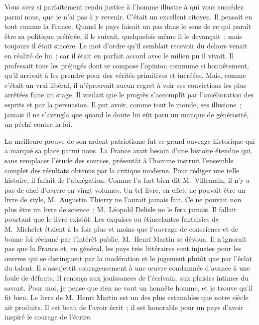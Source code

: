 \documentclass[french,twoside]{book} %
\newcommand\orgName[1]{#1}
\newcommand\persName[1]{#1}
\begin{document}
Vous avez si parfaitement rendu justice à l’homme illustre à qui vous succédez parmi nous, que je n’ai pas à y revenir. C’était un excellent citoyen. Il pensait en tout comme la {\orgName France}. Quand le pays faisait un pas dans le sens de ce qui paraît être sa politique préférée, il le suivait, quelquefois même il le devançait ; mais toujours il était sincère. Le mot d’ordre qu’il semblait recevoir du dehors venait en réalité de lui ; car il était en parfait accord avec le milieu pu il vivait. Il professait tous les préjugés dont se compose l’opinion commune si honnêtement, qu’il arrivait à les prendre pour des vérités primitives et incréées. Mais, comme c’était un vrai libéral, il n’éprouvait aucun regret à voir ses convictions les plus arrêtées faire un stage. Il voulait que le progrès s’accomplît par l’amélioration des esprits et par la persuasion. Il put avoir, comme tout le monde, ses illusions ; jamais il ne s’aveugla que quand le doute lui eût paru un manque de générosité, un péché contre la foi.\par
La meilleure preuve de son ardent patriotisme fut ce grand ouvrage historique qui a marqué sa place parmi nous. La {\orgName France} avait besoin d’une histoire étendue qui, sans remplacer l’étude des sources, présentât à l’homme instruit l’ensemble complet des résultats obtenus par la critique moderne. Pour rédiger une telle histoire, il fallait de l’abnégation. Comme l’a fort bien dit {\persName M. Villemain}, il n’y a pas de chef-d’œuvre en vingt volumes. Un tel livre, en effet, ne pouvait être un livre de style, {\persName M. Augustin Thierry} ne l’aurait jamais fait. Ce ne pouvait non plus être un livre de science ; {\persName M. Léopold Delisle} ne le fera jamais. Il fallait pourtant que le livre existât. Les exquises ou étincelantes fantaisies de {\persName M. Michelet} étaient à la fois plus et moins que l’ouvrage de conscience et de bonne foi réclamé par l’intérêt public. {\persName M. Henri Martin} se dévoua. Il n’ignorait pas que la {\orgName France} et, en général, les pays très littéraires sont injustes pour les œuvres qui se distinguent par la modération et le jugement plutôt que par l’éclat du talent. Il s’assujettit courageusement à une œuvre condamnée d’avance à une foule de défauts. Il renonça aux jouissances de l’écrivain, aux plaisirs intimes du savant. Pour moi, je pense que rien ne vaut un honnête homme, et je trouve qu’il fit bien. Le livre de {\persName M. Henri Martin} est un des plus estimables que notre siècle ait produits. Il est beau de l’avoir écrit ; il est honorable pour un pays d’avoir inspiré le courage de l’écrire.\par
\end{document}
